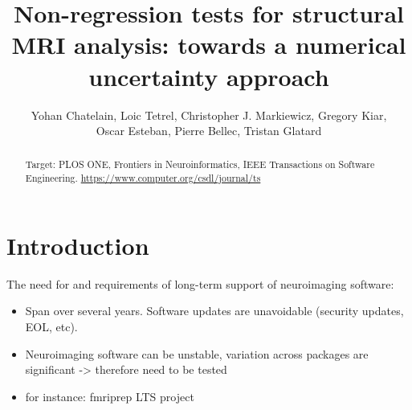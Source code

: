 \documentclass{article}
\title{Non-regression tests for structural MRI analysis: towards a numerical uncertainty approach}
\author{Yohan Chatelain, Loic Tetrel, Christopher J. Markiewicz, Gregory Kiar,\\ Oscar Esteban,  Pierre Bellec, Tristan Glatard}
\begin{document}
\maketitle

\begin{abstract}
    Target: PLOS ONE, Frontiers in Neuroinformatics,  IEEE Transactions on
    Software Engineering. \url{https://www.computer.org/csdl/journal/ts}
\end{abstract}

\section{Introduction}

The need for and requirements of long-term support of neuroimaging software:
\begin{itemize}
    \item Span over several years. Software updates are unavoidable (security
          updates, EOL, etc).
    \item Neuroimaging software can be unstable, variation across packages are
          significant -> therefore need to be tested
    \item for instance: fmriprep LTS project
\end{itemize}
\end{document}
